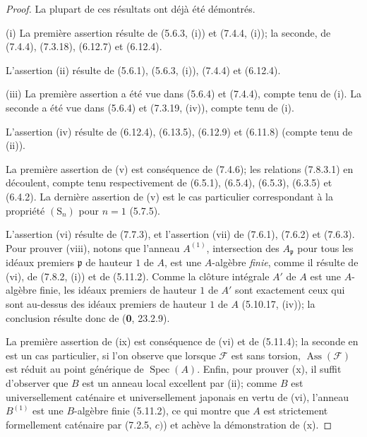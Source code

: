 \begin{proof}
La plupart de ces résultats ont déjà été démontrés.

(i) La première assertion résulte de (5.6.3, (i)) et (7.4.4, (i)); la seconde,
de (7.4.4), (7.3.18), (6.12.7) et (6.12.4).

L'assertion (ii) résulte de (5.6.1), (5.6.3, (i)), (7.4.4) et (6.12.4).

(iii) La première assertion a été vue dans (5.6.4) et (7.4.4), compte tenu de
(i). La seconde a été vue dans (5.6.4) et (7.3.19, (iv)), compte tenu de (i).

L'assertion (iv) résulte de (6.12.4), (6.13.5), (6.12.9) et (6.11.8) (compte
tenu de (ii)).

La première assertion de (v) est conséquence de (7.4.6); les relations
(7.8.3.1) en découlent, compte tenu respectivement de (6.5.1), (6.5.4),
(6.5.3), (6.3.5) et (6.4.2). La dernière assertion de (v) est le cas
particulier correspondant à la propriété $(\mathrm S_n)$ pour $n=1$ (5.7.5).

L'assertion (vi) résulte de (7.7.3), et l'assertion (vii) de (7.6.1), (7.6.2)
et (7.6.3). Pour prouver (viii), notons que l'anneau $A^{(1)}$, intersection
des $A_{\mathfrak p}$ pour tous les idéaux premiers $\mathfrak p$ de hauteur
$1$ de $A$, est une $A$-algèbre \emph{finie}, comme il résulte de (vi), de (7.8.2,
(i)) et de (5.11.2). Comme la clôture intégrale $A'$ de $A$ est une $A$-algèbre
finie, les idéaux premiers de hauteur $1$ de $A'$ sont exactement ceux qui sont
au-dessus des idéaux premiers de hauteur $1$ de $A$ (5.10.17, (iv)); la
conclusion résulte donc de (\textbf{0}, 23.2.9).

La première assertion de (ix) est conséquence de (vi) et de (5.11.4); la
seconde en est un cas particulier, si l'on observe que lorsque $\mathcal F$ est
sans torsion, $\operatorname{Ass}(\mathcal F)$ est réduit au point générique de
$\operatorname{Spec}(A)$. Enfin, pour prouver (x), il suffit d'observer que $B$
est un anneau local excellent par (ii); comme $B$ est universellement caténaire
et universellement japonais en vertu de (vi), l'anneau $B^{(1)}$ est une
$B$-algèbre finie (5.11.2), ce qui montre que $A$ est strictement formellement
caténaire par (7.2.5, $c)$) et achève la démonstration de (x).
\end{proof}

